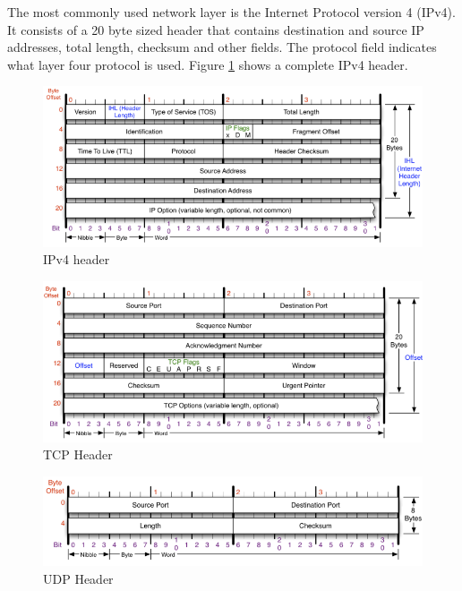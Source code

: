 The most commonly used network layer is the Internet Protocol version 4 (IPv4).
It consists of a 20 byte sized header that contains destination and source IP
addresses, total length, checksum and other fields. The protocol field indicates what layer four protocol is used. Figure \ref{fig:ip} shows a complete IPv4 header.

\begin{figure}[tb!]
    \centering
    \includegraphics[width=\textwidth]{images/theory/ip.png}
    \caption{IPv4 header \cite{ip}}
    \label{fig:ip}
\end{figure}
\begin{figure}[tb!]
    \centering
    \includegraphics[width=\textwidth]{images/theory/tcp.png}
    \caption{TCP Header \cite{tcpudp}}
    \label{fig:tcp}
\end{figure}
\begin{figure}[tb!]
    \centering
    \includegraphics[width=\textwidth]{images/theory/udp.png}
    \caption{UDP Header \cite{tcpudp}}
    \label{fig:udp}
\end{figure}


